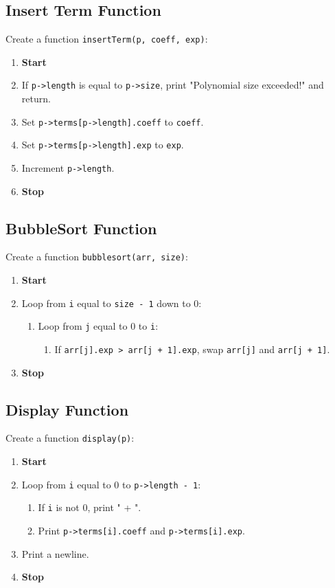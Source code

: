 {  \subsection{Insert Term Function}
  Create a function \texttt{insertTerm(p, coeff, exp)}:
  \begin{enumerate}[label=\arabic*:,left=0pt]
    \item \textbf{Start}
    \item If \texttt{p->length} is equal to \texttt{p->size}, print "Polynomial size exceeded!" and return.
    \item Set \texttt{p->terms[p->length].coeff} to \texttt{coeff}.
    \item Set \texttt{p->terms[p->length].exp} to \texttt{exp}.
    \item Increment \texttt{p->length}.
    \item \textbf{Stop}
  \end{enumerate}

  \subsection{BubbleSort Function}
  Create a function \texttt{bubblesort(arr, size)}:
  \begin{enumerate}[label=\arabic*:,left=0pt]
    \item \textbf{Start}
    \item Loop from \texttt{i} equal to \texttt{size - 1} down to 0:
          \begin{enumerate}[label=2.\arabic*:, start=1]
            \item Loop from \texttt{j} equal to 0 to \texttt{i}:
                  \begin{enumerate}[label=2.1.\arabic*:, start=1]
                    \item If \texttt{arr[j].exp > arr[j + 1].exp}, swap \texttt{arr[j]} and \texttt{arr[j + 1]}.
                  \end{enumerate}
          \end{enumerate}
    \item \textbf{Stop}
  \end{enumerate}

  \subsection{Display Function}
  Create a function \texttt{display(p)}:
  \begin{enumerate}[label=\arabic*:,left=0pt]
    \item \textbf{Start}
    \item Loop from \texttt{i} equal to 0 to \texttt{p->length - 1}:
          \begin{enumerate}[label=2.\arabic*:, start=1]
            \item If \texttt{i} is not 0, print " + ".
            \item Print \texttt{p->terms[i].coeff} and \texttt{p->terms[i].exp}.
          \end{enumerate}
    \item Print a newline.
    \item \textbf{Stop}
  \end{enumerate}

}
